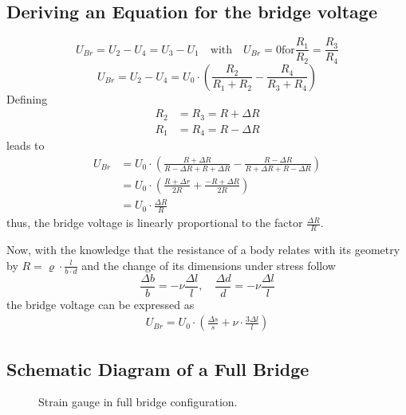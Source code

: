         \subsection{Deriving an Equation for the bridge voltage}\label{sec:A4 equation for full bridge circuit}%
            \begin{equation}
                U_{Br} = U_2 - U_4 = U_3 - U_1 \quad \text{with} \quad U_{Br} = 0 \text{for} \frac{R_1}{R_2} = \frac{R_3}{R_4}
            \end{equation}
            \begin{equation}
                U_{Br} = U_2 - U_4 = U_0 \cdot \left(\frac{R_2}{R_1 + R_2} - \frac{R_4}{R_3 + R_4}\right)
            \end{equation}
            Defining
            \begin{align}
                R_2 &= R_3 = R + \Delta R \\
                R_1 &= R_4 = R - \Delta R
            \end{align}
            leads to
            \begin{align}
                U_{Br}  &= U_0 \cdot \left(\frac{R + \Delta R}{R - \Delta R + R + \Delta R} - \frac{R - \Delta R}{R + \Delta R + R - \Delta R}\right) \nonumber \\
                        &= U_0 \cdot \left(\frac{R+\Delta r}{2R} + \frac{-R + \Delta R}{2R}\right) \nonumber \\
                        &= U_0 \cdot \frac{\Delta R}{R}
                \label{eq:Ubr and delta R}
            \end{align}
            thus, the bridge voltage is linearly proportional to the factor \( \frac{\Delta R}{R} \).\par
            Now, with the knowledge that the resistance of a body relates with its geometry by
            \( R = \varrho \cdot \frac{l}{b \cdot d} \) and the change of its dimensions under stress follow
            \begin{equation}
                \frac{\Delta b}{b} = -\nu \frac{\Delta l}{l}, \quad \frac{\Delta d}{d} = -\nu \frac{\Delta l}{l}
            \end{equation}
            the bridge voltage can be expressed as
            \begin{align}
                U_{Br} = U_0 \cdot \left( \frac{\Delta s}{s} + \nu \cdot \frac{3 \Delta l}{l}\right)
            \end{align}
        \subsection{Schematic Diagram of a Full Bridge}\label{sec:A5 schematic diagram full bridge}%
            \begin{figure}[H]
                \centering
                
                \caption[Strain gauge in full bridge configuration]{Strain gauge in full bridge configuration.}
                \label{fig:strain gauge full bridge}
            \end{figure}
